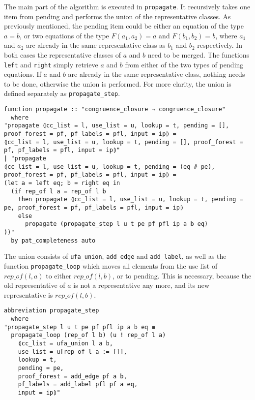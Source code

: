 The main part of the algorithm is executed in \lstinline{propagate}. It recursively takes one item from pending and performs the union of the representative classes. As previously mentioned, the pending item could be either an equation of the type $a = b$, or two equations of the type $F(a_1, a_2) = a$ and $F(b_1, b_2) = b$, where $a_1$ and $a_2$ are already in the same representative class as $b_1$ and $b_2$ respectively. In both cases the representative classes of $a$ and $b$ need to be merged. The functions \lstinline{left} and \lstinline{right} simply retrieve $a$ and $b$ from either of the two types of pending equations. If $a$ and $b$ are already in the same representative class, nothing needs to be done, otherwise the union is performed. For more clarity, the union is defined separately as \lstinline{propagate_step}.

\begin{lstlisting}
function propagate :: "congruence_closure ⇒ congruence_closure"
  where
"propagate ⦇cc_list = l, use_list = u, lookup = t, pending = [], proof_forest = pf, pf_labels = pfl, input = ip⦈ =
⦇cc_list = l, use_list = u, lookup = t, pending = [], proof_forest = pf, pf_labels = pfl, input = ip⦈"
| "propagate
⦇cc_list = l, use_list = u, lookup = t, pending = (eq # pe), proof_forest = pf, pf_labels = pfl, input = ip⦈ =
(let a = left eq; b = right eq in
  (if rep_of l a = rep_of l b
    then propagate ⦇cc_list = l, use_list = u, lookup = t, pending = pe, proof_forest = pf, pf_labels = pfl, input = ip⦈
    else
      propagate (propagate_step l u t pe pf pfl ip a b eq)
))"
  by pat_completeness auto
\end{lstlisting}

The union consists of \lstinline{ufa_union}, \lstinline{add_edge} and \lstinline{add_label}, as well as the function \lstinline|propagate_loop| which moves all elements from the use list of $rep\_of(l,a)$ to either $rep\_of(l, b)$, or to pending. This is necessary, because the old representative of $a$ is not a representative any more, and its new representative is  $rep\_of(l, b)$.

\begin{lstlisting}
abbreviation propagate_step
  where
"propagate_step l u t pe pf pfl ip a b eq ≡
  propagate_loop (rep_of l b) (u ! rep_of l a)
    ⦇cc_list = ufa_union l a b,
    use_list = u[rep_of l a := []],
    lookup = t,
    pending = pe,
    proof_forest = add_edge pf a b,
    pf_labels = add_label pfl pf a eq,
    input = ip⦈"
\end{lstlisting}

